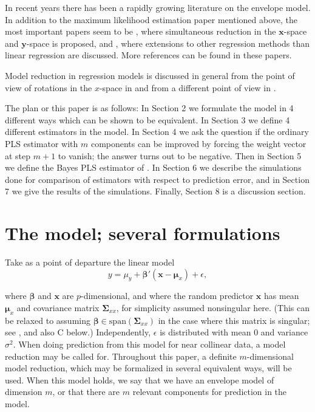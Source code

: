 \documentclass[a4paper, 11pt]{article}
\begin{document}
In recent years there has been a rapidly growing literature on the envelope model. In addition to the maximum likelihood estimation paper mentioned above, the most important papers seem to be \citet{cook2015simultaneous}, where simultaneous reduction in the $\bm{x}$-space and $\bm{y}$-space is proposed, and \citet{cook2015foundations}, where extensions to other regression methods than linear regression are discussed. More references can be found in these papers.

 Model reduction in regression models is discussed in general from the point of view of rotations in the $x$-space in \citet{helland2001reduction} and from a different point of view in \citet{helland2000model}.

The plan or this paper is as follows: In Section 2 we formulate the model in 4 different ways which can be shown to be equivalent. In Section 3 we define 4 different estimators in the model. In Section 4 we ask the question if the ordinary PLS estimator with $m$ components can be improved by forcing the weight vector at step $m+1$ to vanish; the answer turns out to be negative. Then in Section 5 we define the Bayes PLS estimator of \citet{helland2012near}. In Section 6 we describe the simulations done for comparison of estimators with respect to prediction error, and in Section 7 we give the results of the simulations. Finally, Section 8 is a discussion section.

\section{The model; several formulations}

Take as a point of departure the linear model
\begin{equation}
  \label{model}
  y=\mu_{y}+\bm{\beta}'(\bm{x}-\bm{\mu}_{x})+\epsilon,
\end{equation}

where $\bm{\beta}$ and $\bm{x}$ are $p$-dimensional, and where the random predictor $\bm{x}$ has mean $\bm{\mu}_{x}$ and covariance matrix $\bm{\Sigma}_{xx}$, for simplicity assumed nonsingular here. (This can be relaxed to assuming $\bm{\beta}\in\mathrm{span}(\bm{\Sigma}_{xx})$ in the case where this matrix is singular; see \citet{cook2013envelopes}, and also C below.) Independently, $\epsilon$ is distributed with mean $0$ and variance $\sigma^2$. When doing prediction from this model for near collinear data, a model reduction may be called for. Throughout this paper, a definite $m$-dimensional model reduction, which may be formalized in several equivalent ways, will be used. When this model holds, we say that we have an envelope model of dimension $m$, or that there are $m$ relevant components for prediction in the model. \smallskip
\end{document}
